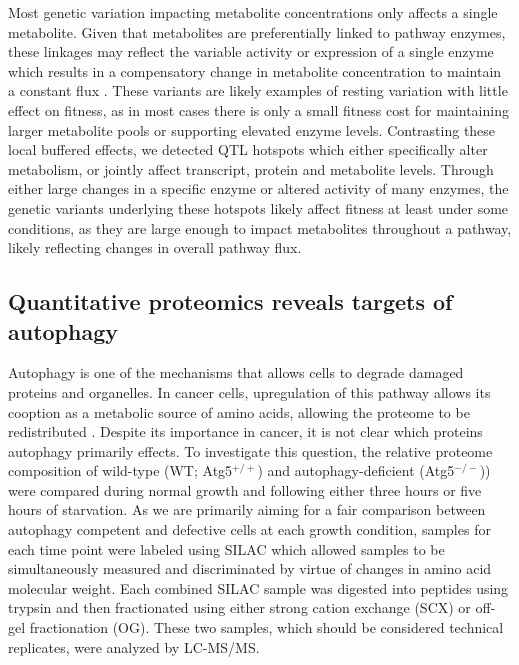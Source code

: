 Most genetic variation impacting metabolite concentrations only affects a single metabolite.  Given that metabolites are preferentially linked to pathway enzymes, these linkages may reflect the variable activity or expression of a single enzyme which results in a compensatory change in metabolite concentration to maintain a constant flux \cite{Fendt:2010gr}. These variants are likely examples of resting variation with little effect on fitness, as in most cases there is only a small fitness cost for maintaining larger metabolite pools or supporting elevated enzyme levels.  Contrasting these local buffered effects, we detected QTL hotspots which either specifically alter metabolism, or jointly affect transcript, protein and metabolite levels.  Through either large changes in a specific enzyme or altered activity of many enzymes, the genetic variants underlying these hotspots likely affect fitness at least under some conditions, as they are large enough to impact metabolites throughout a pathway, likely reflecting changes in overall pathway flux.

\subsection{Quantitative proteomics reveals targets of autophagy}
  
 Autophagy is one of the mechanisms that allows cells to degrade damaged proteins and organelles.  In cancer cells, upregulation of this pathway allows its cooption as a metabolic source of amino acids, allowing the proteome to be redistributed \cite{Rabinowitz:2010fx}.  Despite its importance in cancer, it is not clear which proteins autophagy primarily effects.  To investigate this question, the relative proteome composition of wild-type (WT; Atg5$^{+/+}$) and  autophagy-deficient (Atg5$^{-/-}$)) were compared during normal growth and following either three hours or five hours of starvation.  As we are primarily aiming for a fair comparison between autophagy competent and defective cells at each growth condition, samples for each time point were labeled using SILAC \cite{Ong:2002tf} which allowed samples to be simultaneously measured and discriminated by virtue of changes in amino acid molecular weight.  Each combined SILAC sample was digested into peptides using trypsin and then fractionated using either strong cation exchange (SCX) or off-gel fractionation (OG).  These two samples, which should be considered technical replicates, were analyzed by LC-MS/MS.  
 
